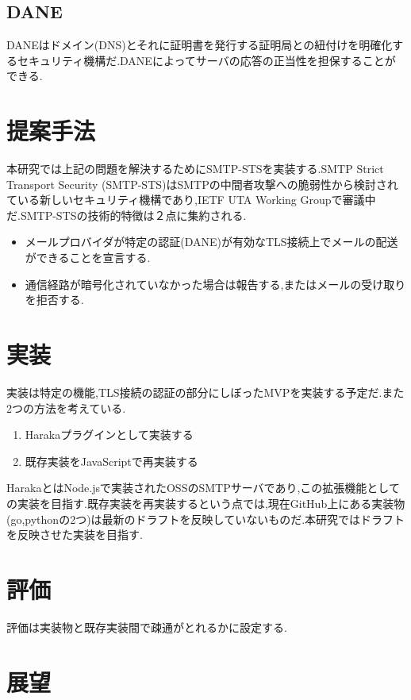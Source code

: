\documentclass[a4j,10pt]{jsarticle}
\begin{document}
\subsection{DANE}
DANEはドメイン(DNS)とそれに証明書を発行する証明局との紐付けを明確化するセキュリティ機構だ.DANEによってサーバの応答の正当性を担保することができる.

\section{提案手法}

本研究では上記の問題を解決するためにSMTP-STSを実装する.SMTP Strict Transport Security (SMTP-STS)はSMTPの中間者攻撃への脆弱性から検討されている新しいセキュリティ機構であり,IETF UTA Working Groupで審議中だ.\cite{draft}SMTP-STSの技術的特徴は２点に集約される.

\begin{itemize}
\item メールプロバイダが特定の認証(DANE)が有効なTLS接続上でメールの配送ができることを宣言する.
\item 通信経路が暗号化されていなかった場合は報告する,またはメールの受け取りを拒否する.
\end{itemize}

\section{実装}

実装は特定の機能,TLS接続の認証の部分にしぼったMVPを実装する予定だ.また2つの方法を考えている.

\begin{enumerate}
\item Harakaプラグインとして実装する
\item 既存実装をJavaScriptで再実装する
\end{enumerate}

HarakaとはNode.jsで実装されたOSSのSMTPサーバであり,この拡張機能としての実装を目指す.既存実装を再実装するという点では,現在GitHub上にある実装物(go,pythonの2つ)は最新のドラフトを反映していないものだ.本研究ではドラフトを反映させた実装を目指す.

\section{評価}

評価は実装物と既存実装間で疎通がとれるかに設定する.

\section{展望}
\end{document}
